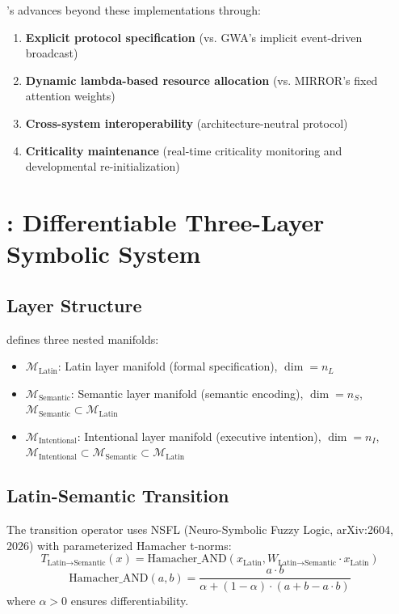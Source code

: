 \documentclass[11pt,a4paper]{article}
\theoremstyle{definition}
\theoremstyle{remark}
\newcommand{\CAA}{\text{CAA-X}}
\newcommand{\CML}{\text{CML 2.0}}
\newcommand{\GWP}{\text{GWP}}
\newcommand{\M}{\mathcal{M}}
\begin{document}
\CAA{}'s \GWP{} advances beyond these implementations through:
\begin{enumerate}
    \item \textbf{Explicit protocol specification} (vs. GWA's implicit event-driven broadcast)
    \item \textbf{Dynamic lambda-based resource allocation} (vs. MIRROR's fixed attention weights)
    \item \textbf{Cross-system interoperability} (architecture-neutral protocol)
    \item \textbf{Criticality maintenance} (real-time criticality monitoring and developmental re-initialization)
\end{enumerate}

\section{\CML{}: Differentiable Three-Layer Symbolic System}\label{sec:cml}

\subsection{Layer Structure}\label{subsec:cml-structure}

\CML{} defines three nested manifolds:
\begin{itemize}
    \item $\M_{\text{Latin}}$: Latin layer manifold (formal specification), $\dim = n_L$
    \item $\M_{\text{Semantic}}$: Semantic layer manifold (semantic encoding), $\dim = n_S$, $\M_{\text{Semantic}} \subset \M_{\text{Latin}}$
    \item $\M_{\text{Intentional}}$: Intentional layer manifold (executive intention), $\dim = n_I$, $\M_{\text{Intentional}} \subset \M_{\text{Semantic}} \subset \M_{\text{Latin}}$
\end{itemize}

\subsection{Latin-Semantic Transition}\label{subsec:latin-semantic}

The transition operator uses NSFL (Neuro-Symbolic Fuzzy Logic, arXiv:2604, 2026) with parameterized Hamacher t-norms:
\begin{equation}
T_{\text{Latin}\rightarrow\text{Semantic}}(x) = \text{Hamacher\_AND}(x_{\text{Latin}}, W_{\text{Latin}\rightarrow\text{Semantic}} \cdot x_{\text{Latin}})
\end{equation}
\begin{equation}
\text{Hamacher\_AND}(a, b) = \frac{a \cdot b}{\alpha + (1-\alpha) \cdot (a + b - a \cdot b)}
\end{equation}
where $\alpha > 0$ ensures differentiability.
\end{document}

